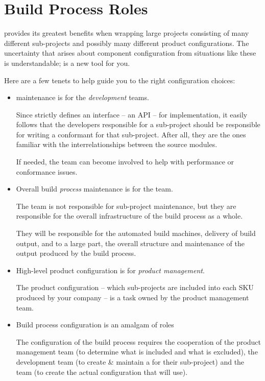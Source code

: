 \section{Build Process Roles}\label{wrap:build-process-roles}

\lmsbw provides its greatest benefits when wrapping large projects
consisting of many different sub-projects and possibly many different
product configurations.  The uncertainty that arises about component
configuration from situations like these is understandable; \lmsbw is
a new tool for you.

Here are a few tenets to help guide you to the right configuration
choices:

\begin{itemize}
  \item \makefile maintenance is for the \emph{development} teams.

    Since \lmsbw strictly defines an interface -- an API -- for
    \makefile implementation, it easily follows that the developers
    responsible for a sub-project should be responsible for writing a
    conformant \makefile for that sub-project.  After all, they are
    the ones familiar with the interrelationships between the source
    modules.

    If needed, the \bni team can become involved to help with
    performance or conformance issues.

  \item Overall build \emph{process} maintenance is for the
    \emph{\bni} team.

    The \bni team is not responsible for sub-project \makefile
    maintenance, but they are responsible for the overall
    infrastructure of the build process as a whole.

    They will be responsible for the automated build machines,
    delivery of build output, and to a large part, the overall
    structure and maintenance of the output produced by the build
    process.

  \item High-level product configuration is for \emph{product
    management}.

    The product configuration -- which sub-projects are included into
    each SKU produced by your company -- is a task owned by the
    product management team.

  \item Build process configuration is an amalgam of roles

    The configuration of the build process requires the cooperation of
    the product management team (to determine what is included and
    what is excluded), the development team (to create \& maintain a
    \makefile for their sub-project) and the \bni team (to create the
    actual configuration that \lmsbw will use).
\end{itemize}

